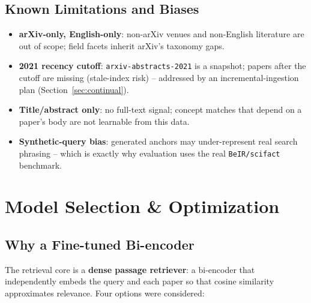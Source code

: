 \documentclass[12pt,a4paper]{article}
\begin{document}
\subsection{Known Limitations and Biases}

\begin{itemize}\setlength\itemsep{0.15em}
  \item \textbf{arXiv-only, English-only}: non-arXiv venues and non-English literature are out of scope; field facets inherit arXiv's taxonomy gaps.
  \item \textbf{2021 recency cutoff}: \texttt{arxiv-abstracts-2021} is a snapshot; papers after the cutoff are missing (stale-index risk) -- addressed by an incremental-ingestion plan (Section~\ref{sec:continual}).
  \item \textbf{Title/abstract only}: no full-text signal; concept matches that depend on a paper's body are not learnable from this data.
  \item \textbf{Synthetic-query bias}: generated anchors may under-represent real search phrasing -- which is exactly why evaluation uses the real \texttt{BeIR/scifact} benchmark.
\end{itemize}

\section{Model Selection \& Optimization}

\subsection{Why a Fine-tuned Bi-encoder}

The retrieval core is a \textbf{dense passage retriever}: a bi-encoder that independently embeds the query and each paper so that cosine similarity approximates relevance. Four options were considered:
\end{document}

